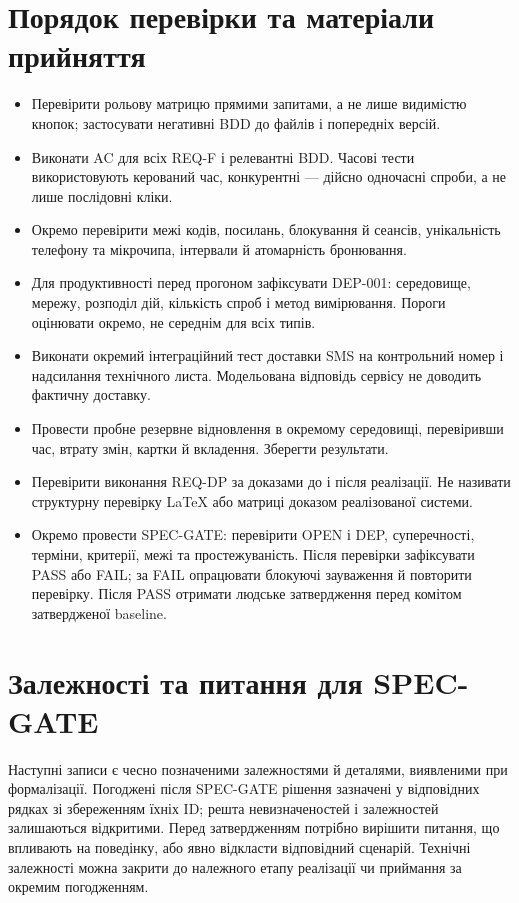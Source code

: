 \documentclass[11pt,a4paper]{article}
\begin{document}
\section{Порядок перевірки та матеріали прийняття}
\begin{itemize}
\item Перевірити рольову матрицю прямими запитами, а не лише видимістю кнопок; застосувати негативні BDD до файлів і попередніх версій.
\item Виконати AC для всіх REQ-F і релевантні BDD. Часові тести використовують керований час, конкурентні — дійсно одночасні спроби, а не лише послідовні кліки.
\item Окремо перевірити межі кодів, посилань, блокування й сеансів, унікальність телефону та мікрочипа, інтервали й атомарність бронювання.
\item Для продуктивності перед прогоном зафіксувати DEP-001: середовище, мережу, розподіл дій, кількість спроб і метод вимірювання. Пороги оцінювати окремо, не середнім для всіх типів.
\item Виконати окремий інтеграційний тест доставки SMS на контрольний номер і надсилання технічного листа. Модельована відповідь сервісу не доводить фактичну доставку.
\item Провести пробне резервне відновлення в окремому середовищі, перевіривши час, втрату змін, картки й вкладення. Зберегти результати.
\item Перевірити виконання REQ-DP за доказами до і після реалізації. Не називати структурну перевірку LaTeX або матриці доказом реалізованої системи.
\item Окремо провести SPEC-GATE: перевірити OPEN і DEP, суперечності, терміни, критерії, межі та простежуваність. Після перевірки зафіксувати PASS або FAIL; за FAIL опрацювати блокуючі зауваження й повторити перевірку. Після PASS отримати людське затвердження перед комітом затвердженої baseline.
\end{itemize}

\section{Залежності та питання для SPEC-GATE}
Наступні записи є чесно позначеними залежностями й деталями, виявленими при формалізації. Погоджені після SPEC-GATE рішення зазначені у відповідних рядках зі збереженням їхніх ID; решта невизначеностей і залежностей залишаються відкритими. Перед затвердженням потрібно вирішити питання, що впливають на поведінку, або явно відкласти відповідний сценарій. Технічні залежності можна закрити до належного етапу реалізації чи приймання за окремим погодженням.
\end{document}
